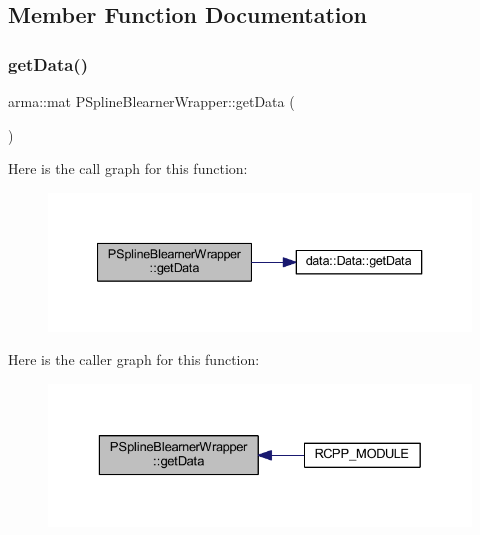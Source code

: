 \subsection{Member Function Documentation}
\mbox{\label{class_p_spline_blearner_wrapper_ad18db8163e5356b45e5196a51d2561a8}} 
\subsubsection{\texorpdfstring{get\+Data()}{getData()}}
{\footnotesize\ttfamily arma\+::mat P\+Spline\+Blearner\+Wrapper\+::get\+Data (\begin{DoxyParamCaption}{ }\end{DoxyParamCaption})\hspace{0.3cm}{\ttfamily [inline]}}

Here is the call graph for this function\+:
\nopagebreak
\begin{figure}[H]
\begin{center}
\leavevmode
\includegraphics[width=340pt]{class_p_spline_blearner_wrapper_ad18db8163e5356b45e5196a51d2561a8_cgraph}
\end{center}
\end{figure}
Here is the caller graph for this function\+:
\nopagebreak
\begin{figure}[H]
\begin{center}
\leavevmode
\includegraphics[width=329pt]{class_p_spline_blearner_wrapper_ad18db8163e5356b45e5196a51d2561a8_icgraph}
\end{center}
\end{figure}
\mbox{\label{class_p_spline_blearner_wrapper_a2d9c9e319c4638c85a4d419918929f9b}} 
